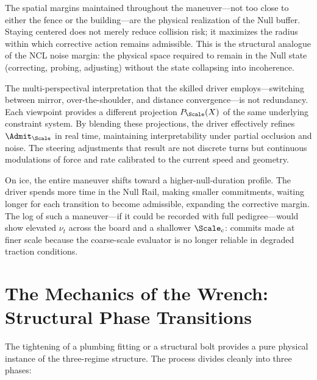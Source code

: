 \documentclass[11pt,oneside]{book}
\begin{document}
The spatial margins maintained throughout the maneuver---not too close to either the fence or the building---are the physical realization of the Null buffer. Staying centered does not merely reduce collision risk; it maximizes the radius within which corrective action remains admissible. This is the structural analogue of the NCL noise margin: the physical space required to remain in the Null state (correcting, probing, adjusting) without the state collapsing into incoherence.

The multi-perspectival interpretation that the skilled driver employs---switching between mirror, over-the-shoulder, and distance convergence---is not redundancy. Each viewpoint provides a different projection $P_\Scale(X)$ of the same underlying constraint system. By blending these projections, the driver effectively refines $\Admit_\Scale$ in real time, maintaining interpretability under partial occlusion and noise. The steering adjustments that result are not discrete turns but continuous modulations of force and rate calibrated to the current speed and geometry.

On ice, the entire maneuver shifts toward a higher-null-duration profile. The driver spends more time in the Null Rail, making smaller commitments, waiting longer for each transition to become admissible, expanding the corrective margin. The log of such a maneuver---if it could be recorded with full pedigree---would show elevated $\nu_t$ across the board and a shallower $\Scale_c$: commits made at finer scale because the coarse-scale evaluator is no longer reliable in degraded traction conditions.

\section{The Mechanics of the Wrench: Structural Phase Transitions}

The tightening of a plumbing fitting or a structural bolt provides a pure physical instance of the three-regime structure. The process divides cleanly into three phases:
\end{document}
